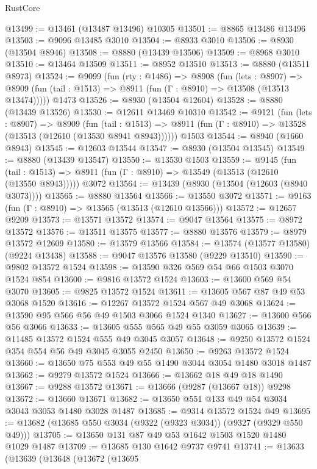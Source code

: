 \begin{lexlean}{RustCore}
\begin{coremodule}
@13499 := @13461 (@13487 @13496) @10305
@13501 := @8865 @13486 @13496
@13503 := @9096 @13485 @3010
@13504 := @8933 @3010
@13506 := @8930 (@13504 @8946)
@13508 := @8880 (@13439 @13506)
@13509 := @8968 @3010
@13510 := @13464 @13509
@13511 := @8952 @13510
@13513 := @8880 (@13511 @8973)
@13524 := @9099
    (fun (rty : @1486) =>
    @8908
      (fun (lets : @8907) =>
      @8909 (fun (tail : @1513) => @8911 (fun (Γ : @8910) => @13508 (@13513 @13474)))))
    @1473
@13526 := @8930 (@13504 @12604)
@13528 := @8880 (@13439 @13526)
@13530 := @12611 @13469 @10310
@13542 := @9121
    (fun (lets : @8907) =>
    @8909
      (fun (tail : @1513) =>
      @8911 (fun (Γ : @8910) => @13528 (@13513 (@12610 (@13530 @8941 @8943))))))
    @1503
@13544 := @8940 (@1660 @8943)
@13545 := @12603 @13544
@13547 := @8930 (@13504 @13545)
@13549 := @8880 (@13439 @13547)
@13550 := @13530 @1503
@13559 := @9145
    (fun (tail : @1513) => @8911 (fun (Γ : @8910) => @13549 (@13513 (@12610 (@13550 @8943)))))
    @3072
@13564 := @13439 (@8930 (@13504 (@12603 (@8940 @3073))))
@13565 := @8880 @13564
@13566 := @13550 @3072
@13571 := @9163 (fun (Γ : @8910) => @13565 (@13513 (@12610 @13566)))
@13572 := @12657 @9209
@13573 := @13571 @13572
@13574 := @9047 @13564
@13575 := @8972 @13572
@13576 := @13511 @13575
@13577 := @8880 @13576
@13579 := @8979 @13572 @12609
@13580 := @13579 @13566
@13584 := @13574 (@13577 @13580) (@9224 @13438)
@13588 := @9047 @13576 @13580 (@9229 @13510)
@13590 := @9802 @13572 @1524
@13598 := @13590 @326 @569 @54 @66 @1503 @3070 @1524 @854
@13600 := @9816 @13572 @1524
@13603 := @13600 @569 @54 @3070
@13605 := @9825 @13572 @1524
@13611 := @13605 @567 @87 @49 @53 @3068 @1520
@13616 := @12267 @13572 @1524 @567 @49 @3068
@13624 := @13590 @95 @566 @56 @49 @1503 @3066 @1524 @1340
@13627 := @13600 @566 @56 @3066
@13633 := @13605 @555 @565 @49 @55 @3059 @3065
@13639 := @11485 @13572 @1524 @555 @49 @3045 @3057
@13648 := @9250 @13572 @1524 @354 @554 @56 @49 @3045 @3055 @2450
@13650 := @9263 @13572 @1524
@13660 := @13650 @75 @553 @49 @55 @1490 @3044 @3054 @1480 @3018 @1487
@13662 := @9279 @13572 @1524
@13666 := @13662 @18 @49 @18 @1490
@13667 := @9288 @13572
@13671 := @13666 (@9287 (@13667 @18)) @9298
@13672 := @13660 @13671
@13682 := @13650 @551 @133 @49 @54 @3034 @3043 @3053 @1480 @3028 @1487
@13685 := @9314 @13572 @1524 @49
@13695 := @13682 (@13685 @550 @3034 (@9322 (@9323 @3034)) (@9327 (@9329 @550 @49)))
@13705 := @13650 @131 @87 @49 @53 @1642 @1503 @1520 @1480 @1029 @1487
@13709 := @13685 @130 @1642 @9737 @9741
@13741 := @13633
    (@13639
      (@13648
        (@13672
          (@13695

\end{coremodule}
\end{lexlean}
